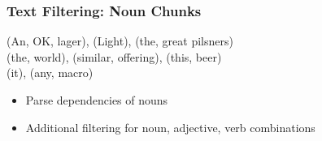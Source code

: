 \begin{frame}
    \frametitle{Text Filtering: Noun Chunks}
\begin{spacing}{1.6}
    (An, OK, lager), (Light), (the, great pilsners) \\
    (the, world), (similar, offering), (this, beer) \\
    (it), (any, macro)
\end{spacing}
\vspace{10pt}
\begin{itemize}
\item Parse dependencies of nouns
\item Additional filtering for noun, adjective, verb combinations
\end{itemize}
\end{frame}


